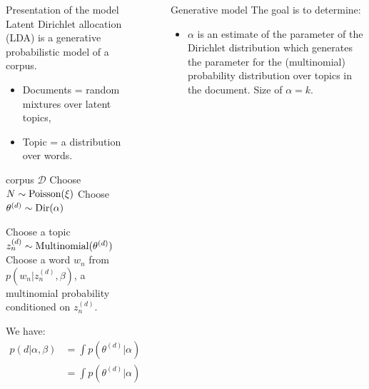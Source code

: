 \documentclass[final]{beamer}
\newlength{\sepwid}
\newlength{\onecolwid}
\begin{document}
\begin{frame}[t]
\begin{columns}[t]
\begin{column}{\onecolwid}
\begin{block}{Presentation of the model}
Latent Dirichlet allocation (LDA) is a generative probabilistic model of a corpus. 
\begin{itemize}
  \item Documents = random mixtures over latent topics,
  \item Topic = a distribution over words. 
\end{itemize} 

\medskip

\begin{algorithmic}[1]
\REQUIRE corpus $\mathcal{D}$
\STATE Choose $N \sim \textnormal{Poisson}(\xi)$
\STATE Choose $\theta^{(d)} \sim \textnormal{Dir}(\alpha)$

\STATE Choose a topic $z_n^{(d)} \sim  \textnormal{Multinomial}(\theta^{(d)})$
\STATE Choose a word $w_n$ from $p(w_n |z_n^{(d)}, \beta)$, a multinomial probability conditioned on $z_n^{(d)}$.
\ENDFOR
\ENDFOR
\end{algorithmic}

We have:
\begin{align*}
p(d|\alpha, \beta) 
& = \int p(\theta^{(d)}|\alpha) \left( \prod_{n=1}^{N_{d}} p(w_n^{(d)}|\theta^{(d)}, \beta)\right) \text{d}\theta  \\
& = \int p(\theta^{(d)}|\alpha) \left( \prod_{n=1}^{N_{d}} \sum_{z_n^{(d)}} p(z_n^{(d)}|\theta^{(d)}) p(w_n^{(d)}|z_n^{(d)}, \beta)\right) \text{d}\theta
\end{align*}

\end{block}

\end{column}



\begin{column}{\sepwid}\end{column} %
\begin{column}{\onecolwid}
\begin{block}{Generative model}
The goal is to determine:
\begin{itemize}
\item $\alpha$ is an estimate of the parameter of the Dirichlet distribution which generates the parameter for the (multinomial) probability distribution over topics in the document. Size of $\alpha = k$.


\end{itemize}
\end{block}
\end{column}
\end{columns}
\end{frame}
\end{document}
